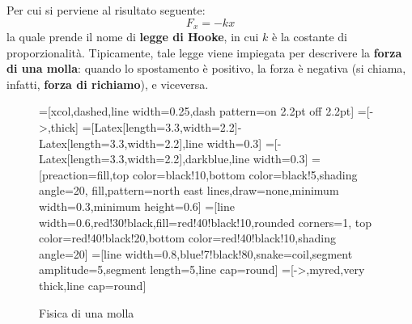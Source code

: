 \documentclass[a4paper]{extarticle}
\begin{document}
\noindent
Per cui si perviene al risultato seguente:
\[\boxed{F_x=-kx}\]
la quale prende il nome di \textbf{legge di Hooke}, in cui $k$ è la costante di proporzionalità. Tipicamente, tale legge viene impiegata per descrivere la \textbf{forza di una molla}: quando lo spostamento è positivo, la forza è negativa (si chiama, infatti, \textbf{forza di richiamo}), e viceversa.

\begin{figure}[H]
  \centering
  =[xcol,dashed,line width=0.25,dash pattern=on 2.2pt off 2.2pt]
  =[->,thick] %
  =[{Latex[length=3.3,width=2.2]}-{Latex[length=3.3,width=2.2]},line width=0.3]
  =[-{Latex[length=3.3,width=2.2]},darkblue,line width=0.3]
  =[preaction={fill,top color=black!10,bottom color=black!5,shading angle=20},
                      fill,pattern=north east lines,draw=none,minimum width=0.3,minimum height=0.6]
  =[line width=0.6,red!30!black,fill=red!40!black!10,rounded corners=1,
                    top color=red!40!black!20,bottom color=red!40!black!10,shading angle=20]
  =[line width=0.8,blue!7!black!80,snake=coil,segment amplitude=5,segment length=5,line cap=round]
  \tikzset{>=latex} %
  =[->,myred,very thick,line cap=round]
  \def\tick#1#2{\draw[thick] (#1)++(#2:0.1) --++ (#2-180:0.2)}

  \caption{Fisica di una molla}
  \label{fig:fisica_molla}
\end{figure}
\end{document}
